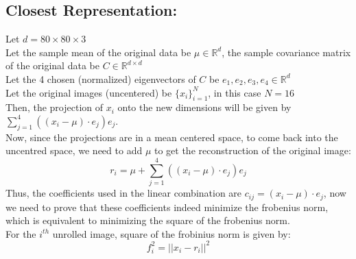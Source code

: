 \documentclass[11pt, fleqn]{article}
\begin{document}
\subsection*{Closest Representation:}
Let $d = 80\times80\times3$\\
Let the sample mean of the original data be $\mu \in \mathbb{R}^d$, the sample covariance matrix of the original data be $C \in \mathbb{R}^{d\times d}$\\
Let the 4 chosen (normalized) eigenvectors of $C$ be $e_1, e_2, e_3, e_4 \in \mathbb{R}^d$\\ 
Let the original images (uncentered) be $\{x_i\}_{i=1}^N$, in this case $N = 16$\\
Then, the projection of $x_i$ onto the new dimensions will be given by $\sum_{j=1}^{4}((x_i - \mu)\cdot e_j)e_j$.\\
Now, since the projections are in a mean centered space, to come back into the uncentred space, we need to add $\mu$ to get the reconstruction of the original image:
$$
    \boxed{r_i = \mu + \sum_{j=1}^{4}((x_i - \mu)\cdot e_j)e_j}
$$
Thus, the coefficients used in the linear combination are $\boxed{c_{ij} = (x_i - \mu)\cdot e_j}$, now we need to prove that these coefficients indeed minimize the frobenius norm, which is equivalent to minimizing the square of the frobenius norm.\\

For the $i^{th}$ unrolled image, square of the frobinius norm is given by:
$$ 
    f_i^2 = ||x_i - r_i||^2 
$$
\end{document}
